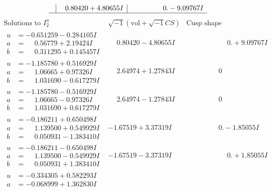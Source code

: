 \documentclass[1p]{elsarticle_modified}
\theoremstyle{definition}
\newcommand{\I}{\sqrt{-1}}
\begin{document}
$$\begin{array}{c|c|c}
 & \phantom{-}0.80420 + 4.80655 I & \phantom{-0.000000 } 0. - 9.09767 I\\
 \hline 
 \end{array}$$\newpage$$\begin{array}{c|c|c}  
\text{Solutions to }I^u_{2}& \I (\text{vol} + \sqrt{-1}CS) & \text{Cusp shape}\\
 \hline 
\begin{aligned}
u &= -0.651259 - 0.284105 I \\
a &= \phantom{-}0.56779 + 2.19424 I \\
b &= \phantom{-}0.311295 + 0.145457 I\end{aligned}
 & \phantom{-}0.80420 - 4.80655 I & \phantom{-0.000000 -}0. + 9.09767 I \\ \hline\begin{aligned}
u &= -1.185780 + 0.516929 I \\
a &= \phantom{-}1.06665 + 0.97326 I \\
b &= \phantom{-}1.031690 - 0.617279 I\end{aligned}
 & \phantom{-}2.64974 + 1.27843 I & \phantom{-0.000000 } 0 \\ \hline\begin{aligned}
u &= -1.185780 - 0.516929 I \\
a &= \phantom{-}1.06665 - 0.97326 I \\
b &= \phantom{-}1.031690 + 0.617279 I\end{aligned}
 & \phantom{-}2.64974 - 1.27843 I & \phantom{-0.000000 } 0 \\ \hline\begin{aligned}
u &= -0.186211 + 0.650498 I \\
a &= \phantom{-}1.139500 + 0.549929 I \\
b &= \phantom{-}0.050931 - 1.383410 I\end{aligned}
 & -1.67519 + 3.37319 I & \phantom{-0.000000 } 0. - 1.85055 I \\ \hline\begin{aligned}
u &= -0.186211 - 0.650498 I \\
a &= \phantom{-}1.139500 - 0.549929 I \\
b &= \phantom{-}0.050931 + 1.383410 I\end{aligned}
 & -1.67519 - 3.37319 I & \phantom{-0.000000 -}0. + 1.85055 I \\ \hline\begin{aligned}
u &= -0.334305 + 0.582293 I \\
a &= -0.068999 + 1.362830 I \\

\end{aligned}
\end{array}$$
\end{document}
